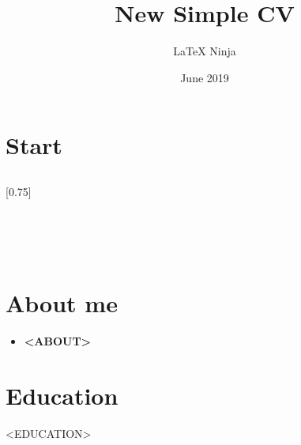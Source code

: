 \documentclass[lighthipster]{simplehipstercv}
\title{New Simple CV}
\author{\LaTeX{} Ninja}
\date{June 2019}
\begin{document}
    \thispagestyle{empty}

    \section*{Start}


    \subsection*{}
    \vspace{4em}

    \setlength{\columnsep}{1.5cm}
    [0.75]
    \begin{paracol}{2}

        \footnotesize
        {\setasidefontcolour
        \flushright
            \begin{center}
            \end{center}


             \\[0.5em]
            \bigskip
             \\[0.5em]
            \bigskip
             \\[0.5em]
            \bigskip

        }

        \switchcolumn

        \small
        \section*{About me}
        \begin{itemize}
            \item \textbf{<ABOUT>}
        \end{itemize}

        \vspace{3em}

        \section*{Education}
        \begin{itemize}
            <EDUCATION>
        \end{itemize}


\end{paracol}
\end{document}
